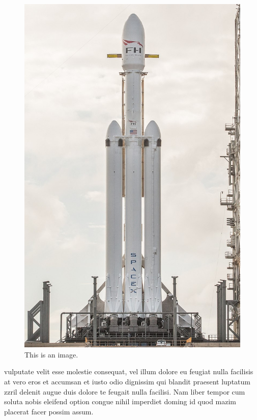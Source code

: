 \documentclass[a4paper,10pt]{article}
\begin{document}
\begin{figure}

\includegraphics[width=\linewidth]{Falcon_Heavy.jpg}

\caption{This is an image.}
\label{fig:falcon}
\end{figure}

vulputate velit esse molestie consequat, vel illum dolore eu feugiat nulla facilisis at vero eros et
accumsan et iusto odio dignissim qui blandit praesent luptatum zzril delenit augue duis dolore te feugait nulla facilisi.
Nam liber tempor cum soluta nobis eleifend option congue nihil imperdiet doming id quod mazim placerat facer possim assum.
\end{document}
